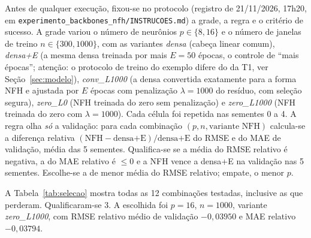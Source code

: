 \documentclass[11pt,a4paper]{article}
\begin{document}
Antes de qualquer execução, fixou-se no protocolo (registro de 21/11/2026, 17h20, em \texttt{experimento\_backbones\_nfh/INSTRUCOES.md}) a grade, a regra e o critério de sucesso. A grade variou o número de neurônios $p\in\{8,16\}$ e o número de janelas de treino $n\in\{300,1000\}$, com as variantes \emph{densa} (cabeça linear comum), \emph{densa+E} (a mesma densa treinada por mais $E=50$ épocas, o controle de ``mais épocas''; atenção: o protocolo de treino do exemplo difere do da T1, ver Seção~\ref{sec:modelo}), \emph{conv\_L1000} (a densa convertida exatamente para a forma NFH e ajustada por $E$ épocas com penalização $\lambda=1000$ do resíduo, com seleção segura), \emph{zero\_L0} (NFH treinada do zero sem penalização) e \emph{zero\_L1000} (NFH treinada do zero com $\lambda=1000$). Cada célula foi repetida nas sementes 0 a 4. A regra olha \emph{só} a validação: para cada combinação $(p,n,\text{variante NFH})$ calcula-se a diferença relativa $(\text{NFH}-\text{densa+E})/\text{densa+E}$ do RMSE e do MAE de validação, média das 5 sementes. Qualifica-se se a média do RMSE relativo é negativa, a do MAE relativo é $\le 0$ e a NFH vence a densa+E na validação nas 5 sementes. Escolhe-se a de menor média do RMSE relativo; empate, o menor $p$.

A Tabela~\ref{tab:selecao} mostra todas as 12 combinações testadas, inclusive as que perderam. Qualificaram-se 3. A escolhida foi $p=16$, $n=1000$, variante \emph{zero\_L1000}, com RMSE relativo médio de validação $-0,03950$ e MAE relativo $-0,03794$.
\end{document}
